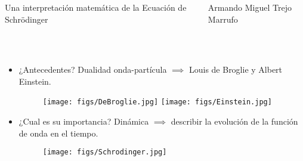 \documentclass[aspectratio=1610]{beamer}
\begin{document}
\begin{frame}

\vspace{0.02\textheight}
  
\begin{columns}[]
\column{37em}
\Large{\centerline{Una interpretación matemática de la Ecuación de Schrödinger}}

\vspace{0.1\textheight}

\vspace{0.1\textheight}

\small{\centerline{Armando Miguel Trejo Marrufo}}
\scriptsize{\centerline{}}
\end{columns}
\end{frame}


\begin{frame}
\frametitle{}
\begin{columns}
\column{37em}
\begin{itemize}\itemsep1em
  \justifying
  \item \textcolor{Ocean}{¿Antecedentes?} 
  \textcolor{TextGreen}{ Dualidad onda-partícula} $\implies$ Louis de Broglie y Albert Einstein.
  
  \begin{figure}%
    \centering
    {{\texttt{[image: figs/DeBroglie.jpg]}}}%
    \qquad
    {{\texttt{[image: figs/Einstein.jpg]}}}%
    
    \label{fig:example}%
\end{figure}
  
  \item  \textcolor{Ocean}{¿Cual es su importancia?} \textcolor{TextGreen}{ Dinámica} $\implies$ describir la evolución de la función de onda en el tiempo.
  
  \begin{figure}%
    \centering
    {{\texttt{[image: figs/Schrodinger.jpg]}}}%
    \label{fig:example}%
\end{figure}
\end{itemize}
\end{columns}
\end{frame}
\end{document}
